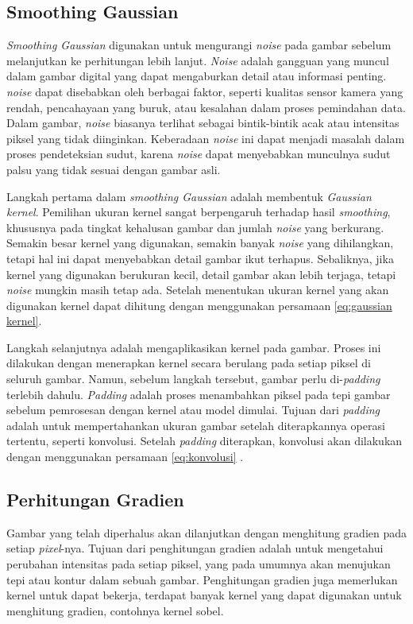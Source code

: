 \subsection{Smoothing Gaussian}
    \emph{Smoothing Gaussian} digunakan untuk mengurangi \emph{noise} pada gambar sebelum melanjutkan ke perhitungan lebih lanjut.
\emph{Noise} adalah gangguan yang muncul dalam gambar digital yang dapat mengaburkan detail atau informasi penting. \emph{noise} dapat disebabkan oleh berbagai faktor, seperti kualitas sensor kamera yang rendah, pencahayaan yang buruk, atau kesalahan dalam proses pemindahan data.
Dalam gambar, \emph{noise} biasanya terlihat sebagai bintik-bintik acak atau intensitas piksel yang tidak diinginkan. Keberadaan \emph{noise} ini dapat menjadi masalah dalam proses pendeteksian sudut, karena \emph{noise} dapat menyebabkan munculnya sudut palsu yang tidak sesuai dengan gambar asli.
    
    Langkah pertama dalam \emph{smoothing Gaussian} adalah membentuk \emph{Gaussian kernel}. Pemilihan ukuran kernel sangat berpengaruh terhadap hasil \emph{smoothing}, khususnya pada tingkat kehalusan gambar dan jumlah \emph{noise} yang berkurang.
Semakin besar kernel yang digunakan, semakin banyak \emph{noise} yang dihilangkan, tetapi hal ini dapat menyebabkan detail gambar ikut terhapus. Sebaliknya, jika kernel yang digunakan berukuran kecil, detail gambar akan lebih terjaga, tetapi \emph{noise} mungkin masih tetap ada.
Setelah menentukan ukuran kernel yang akan digunakan kernel dapat dihitung dengan menggunakan persamaan \eqref{eq:gaussian kernel}.

    Langkah selanjutnya adalah mengaplikasikan kernel pada gambar. Proses ini dilakukan dengan menerapkan kernel secara berulang pada setiap piksel di seluruh gambar.
Namun, sebelum langkah tersebut, gambar perlu di-\emph{padding} terlebih dahulu. \emph{Padding} adalah proses menambahkan piksel pada tepi gambar sebelum pemrosesan dengan kernel atau model dimulai.
Tujuan dari \emph{padding} adalah untuk mempertahankan ukuran gambar setelah diterapkannya operasi tertentu, seperti konvolusi. 
Setelah \emph{padding} diterapkan, konvolusi akan dilakukan dengan menggunakan persamaan \eqref{eq:konvolusi} . 

\subsection{Perhitungan Gradien}
    Gambar yang telah diperhalus akan dilanjutkan dengan menghitung gradien pada setiap \emph{pixel}-nya. Tujuan dari penghitungan gradien adalah untuk mengetahui perubahan intensitas pada setiap piksel, yang pada umumnya akan menujukan tepi atau kontur dalam sebuah gambar.
Penghitungan gradien juga memerlukan kernel untuk dapat bekerja, terdapat banyak kernel yang dapat digunakan untuk menghitung gradien, contohnya kernel sobel. 

